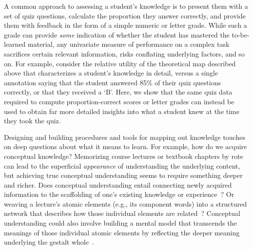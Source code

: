 \documentclass[10pt]{article}
\begin{document}
A common approach to assessing a student's knowledge is to present them with a set of quiz
questions, calculate the proportion they answer correctly, and provide
them with feedback in the form of a simple numeric or letter grade. While such a
grade can provide \textit{some} indication of whether the student has
mastered the to-be-learned material, any univariate measure of performance on a
complex task sacrifices certain relevant information, risks conflating underlying
factors, and so on. For example, consider the relative utility of the
theoretical map described above that characterizes a student's knowledge
in detail, versus a single annotation saying that the student answered 85\% of
their quiz questions correctly, or that they received a `B'. Here, we show that
the same quiz data required to compute proportion-correct scores or letter
grades can instead be used to obtain far more detailed insights into what a
student knew at the time they took the quiz.

Designing and building procedures and tools for mapping out knowledge touches
on deep questions about what it means to learn. For example, how do we acquire
conceptual knowledge? Memorizing course lectures or textbook chapters by rote
can lead to the superficial \textit{appearance} of understanding the underlying
content, but achieving true conceptual understanding seems to require something
deeper and richer. Does conceptual understanding entail connecting newly
acquired information to the scaffolding of one's existing knowledge or
experience~\citep{BlayEtal06,CaraMaho03, ConsEtal16, DeacEtal04, SimoEtal04}?
Or weaving a lecture's atomic elements (e.g., its component words) into a
structured network that describes how those individual elements are
related~\citep{LeeChen22}? Conceptual understanding could also involve building
a mental model that transcends the meanings of those individual atomic elements
by reflecting the deeper meaning underlying the gestalt whole~\citep{Kint70,
Macl05, ScotEtal07}.
\end{document}
